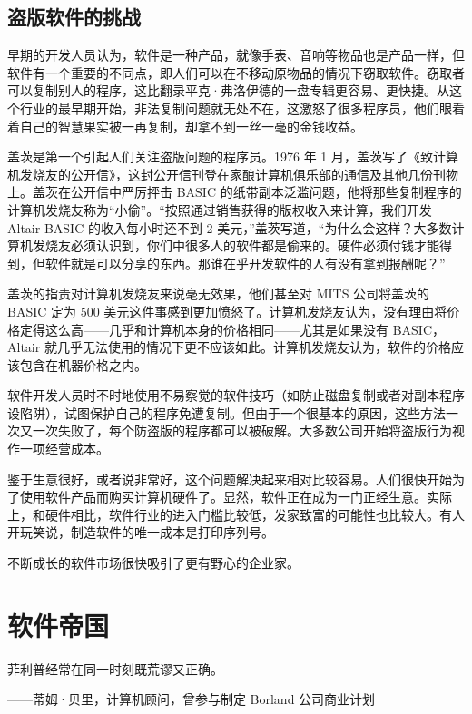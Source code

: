 \documentclass[12pt,UTF8]{ctexbook}
\begin{document}
\subsection{盗版软件的挑战}


早期的开发人员认为，软件是一种产品，就像手表、音响等物品也是产品一样，但软件有一个重要的不同点，即人们可以在不移动原物品的情况下窃取软件。窃取者可以复制别人的程序，这比翻录平克·弗洛伊德的一盘专辑更容易、更快捷。从这个行业的最早期开始，非法复制问题就无处不在，这激怒了很多程序员，他们眼看着自己的智慧果实被一再复制，却拿不到一丝一毫的金钱收益。

盖茨是第一个引起人们关注盗版问题的程序员。1976 年 1 月，盖茨写了《致计算机发烧友的公开信》，这封公开信刊登在家酿计算机俱乐部的通信及其他几份刊物上。盖茨在公开信中严厉抨击 BASIC 的纸带副本泛滥问题，他将那些复制程序的计算机发烧友称为“小偷”。“按照通过销售获得的版权收入来计算，我们开发 Altair BASIC 的收入每小时还不到 2 美元，”盖茨写道，“为什么会这样？大多数计算机发烧友必须认识到，你们中很多人的软件都是偷来的。硬件必须付钱才能得到，但软件就是可以分享的东西。那谁在乎开发软件的人有没有拿到报酬呢？”

盖茨的指责对计算机发烧友来说毫无效果，他们甚至对 MITS 公司将盖茨的 BASIC 定为 500 美元这件事感到更加愤怒了。计算机发烧友认为，没有理由将价格定得这么高——几乎和计算机本身的价格相同——尤其是如果没有 BASIC，Altair 就几乎无法使用的情况下更不应该如此。计算机发烧友认为，软件的价格应该包含在机器价格之内。

软件开发人员时不时地使用不易察觉的软件技巧（如防止磁盘复制或者对副本程序设陷阱），试图保护自己的程序免遭复制。但由于一个很基本的原因，这些方法一次又一次失败了，每个防盗版的程序都可以被破解。大多数公司开始将盗版行为视作一项经营成本。

鉴于生意很好，或者说非常好，这个问题解决起来相对比较容易。人们很快开始为了使用软件产品而购买计算机硬件了。显然，软件正在成为一门正经生意。实际上，和硬件相比，软件行业的进入门槛比较低，发家致富的可能性也比较大。有人开玩笑说，制造软件的唯一成本是打印序列号。

不断成长的软件市场很快吸引了更有野心的企业家。





\section{软件帝国}


菲利普经常在同一时刻既荒谬又正确。

——蒂姆·贝里，计算机顾问，曾参与制定 Borland 公司商业计划
\end{document}
